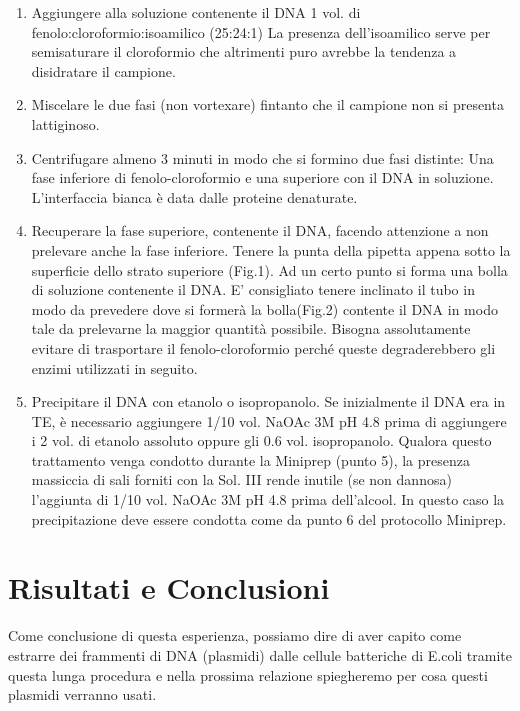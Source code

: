 \begin{enumerate}
  \item Aggiungere alla soluzione contenente il DNA 1 vol. di fenolo:cloroformio:isoamilico (25:24:1)
	La presenza dell’isoamilico serve per semisaturare il cloroformio che altrimenti puro avrebbe la
	tendenza a disidratare il campione.

  \item Miscelare le due fasi (non vortexare) fintanto che il campione non si presenta lattiginoso.

  \item Centrifugare almeno 3 minuti in modo che si formino due fasi distinte:
	Una fase inferiore di fenolo-cloroformio e una superiore con il DNA in soluzione.
	L’interfaccia bianca è data dalle proteine denaturate.

  \item Recuperare la fase superiore, contenente il DNA, facendo attenzione a non
	prelevare anche la fase inferiore. Tenere la punta della pipetta appena sotto la superficie
	dello strato superiore (Fig.1). Ad un certo punto si forma una bolla di soluzione contenente il DNA.
	E’ consigliato tenere inclinato il tubo in modo da prevedere dove si formerà la bolla(Fig.2) contente il DNA in modo
	tale da prelevarne la maggior quantità possibile. Bisogna assolutamente evitare di trasportare il fenolo-cloroformio
	perché queste degraderebbero gli enzimi utilizzati in seguito.

  \item Precipitare il DNA con etanolo o isopropanolo. Se inizialmente il DNA era in TE, è necessario aggiungere 1/10 vol.
	NaOAc 3M pH 4.8 prima di aggiungere i 2 vol. di etanolo assoluto oppure gli 0.6 vol. isopropanolo.
	Qualora questo trattamento venga condotto durante la Miniprep (punto 5), la presenza massiccia di sali forniti con
	la Sol. III  rende inutile (se non dannosa) l’aggiunta di 1/10 vol. NaOAc 3M pH 4.8 prima dell’alcool.
	In questo caso la precipitazione deve essere condotta come da punto 6 del protocollo Miniprep.


\end{enumerate}

\section{Risultati e Conclusioni}

Come conclusione di questa esperienza, possiamo dire di aver capito come estrarre dei frammenti di DNA (plasmidi)
dalle cellule batteriche di E.coli tramite questa lunga procedura e nella prossima relazione spiegheremo per cosa
questi plasmidi verranno usati.
